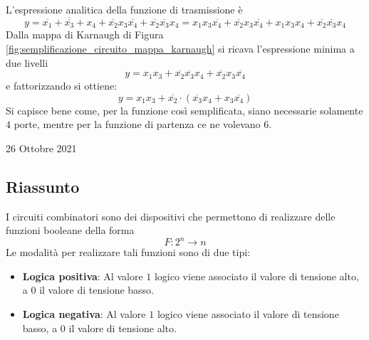 \documentclass[a4paper]{extarticle}
\begin{document}
\noindent
L’espressione analitica della funzione di trasmissione è
\[y = \overline{\overline{x_1} + \overline{x_3} + x_4} + \overline{x_2} x_3 \overline{x_4} + \overline{x_2} \overline{x_3} x_4 = x_1 x_3 \overline{x_4} + \overline{x_2} x_3 \overline{x_4} + x_1 x_3 x_4 + \overline{x_2} \overline{x_3} x_4\]
Dalla mappa di Karnaugh di Figura \ref{fig:semplificazione_circuito_mappa_karnaugh} si ricava l’espressione minima a due livelli
\[y = x_1 x_3 + \overline{x_2} \overline{x_3} x_4 + \overline{x_2} x_3 \overline{x_4}\]
e fattorizzando si ottiene:
\[y = x_1 x_3 + \overline{x_2} \cdot \left(\overline{x_3} x_4 + x_3 \overline{x_4}\right)\]
Si capisce bene come, per la funzione così semplificata, siano necessarie solamente $4$ porte, mentre per la funzione di partenza ce ne volevano $6$.

\newpage
\begin{center}
    26 Ottobre 2021
\end{center}

\subsection{Riassunto}
I circuiti combinatori sono dei dispositivi che permettono di realizzare delle funzioni booleane della forma
\[F : 2^n \rightarrow n\]
Le modalità per realizzare tali funzioni sono di due tipi:
\begin{itemize}
    \item \textbf{Logica positiva}: Al valore \(1\) logico viene associato il valore di tensione alto, a \(0\) il valore di tensione basso.

    \item \textbf{Logica negativa}: Al valore \(1\) logico viene associato il valore di tensione basso, a \(0\) il valore di tensione alto.
\end{itemize}
\end{document}

